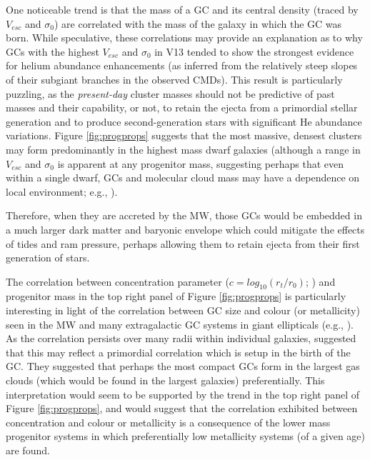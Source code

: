 \documentclass[useAMS,usenatbib]{mn2e}
\begin{document}
One noticeable trend is that the mass of a GC and its central density
(traced by $V_{esc}$ and $\sigma_{0}$) are correlated with the mass of the
galaxy in which the GC was born.  While speculative, these correlations may
provide an explanation as to why GCs with the highest $V_{esc}$ and $\sigma_{0}$
in V13 tended to show the strongest evidence for helium abundance enhancements
(as inferred from the relatively steep slopes of their subgiant branches in the
observed CMDs).  This result is particularly puzzling, as the \emph{present-day}
cluster masses should not be predictive of past masses and their capability, or
not, to retain the ejecta from a primordial stellar generation and to produce
second-generation stars with significant He abundance variations.  Figure
\ref{fig:progprops} suggests that the most massive, densest clusters may form
predominantly in the highest mass dwarf galaxies (although a range in $V_{esc}$
and $\sigma_{0}$ is apparent at any progenitor mass, suggesting perhaps that
even within a single dwarf, GCs and molecular cloud mass may have a dependence
on local environment; e.g., \citealt{Meidt13}).

Therefore, when they are accreted by the MW, those GCs would be embedded in a
much larger dark matter and baryonic envelope which could mitigate the effects
of tides and ram pressure, perhaps allowing them to retain ejecta from their first
generation of stars.  

The correlation between concentration parameter 
($c = log_{10}(r_{t}/r_{0})$; \citealt{Harris10}) and
progenitor mass in the top right panel of Figure \ref{fig:progprops} is 
particularly interesting in light of the correlation between GC size
and colour (or metallicity) seen in the MW and many 
extragalactic GC systems in giant ellipticals (e.g., \citealt{Larsen01}).  As the 
correlation persists over many radii within individual galaxies, \cite{Larsen01}
suggested that this may reflect a primordial correlation which is setup 
in the birth of the GC.  They suggested that perhaps the most compact GCs
form in the largest gas clouds (which would be found in the largest galaxies)
preferentially.  This interpretation would seem to be supported by the trend 
in the top right panel of Figure \ref{fig:progprops}, and would suggest that
the correlation exhibited between concentration and colour or metallicity
is a consequence of the lower mass progenitor systems in which preferentially
low metallicity systems (of a given age) are found.
\end{document}
